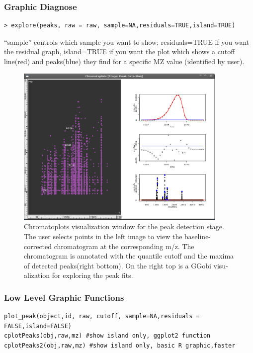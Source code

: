 \documentclass[11pt,a4paper]{article}
\begin{document}
\subsubsection*{Graphic Diagnose}
\begin{verbatim}
> explore(peaks, raw = raw, sample=NA,residuals=TRUE,island=TRUE)
\end{verbatim}

``sample'' controls which sample you want to show; residuals=TRUE if you
want the residual graph, island=TRUE if you want the plot which shows a cutoff line(red)
and peaks(blue) they find for a specific MZ value (identified by user).
\begin{figure}[h!t!b!p]
\begin{center}
  \includegraphics[width=4in]{findpeaks.png}
  \caption{\label{fig:findpeaks}Chromatoplots visualization window for
    the peak detection stage. The user selects points in the left image
    to view the baseline-corrected chromatogram at the corresponding
    m/z. The chromatogram is annotated with the quantile cutoff and
    the maxima of detected peaks(right bottom). On the right top is a GGobi visu-
    alization for exploring the peak fits.}
\end{center}
\end{figure}
\subsubsection*{Low Level Graphic Functions}
\begin{verbatim}
plot_peak(object,id, raw, cutoff, sample=NA,residuals = FALSE,island=FALSE)
cplotPeaks(obj,raw,mz) #show island only, ggplot2 function
cplotPeaks2(obj,raw,mz) #show island only, basic R graphic,faster

\end{verbatim}
\end{document}
